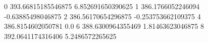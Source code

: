 0 393.66815185546875 6.852691650390625
1 386.1766052246094 -0.63885498046875
2 386.56170654296875 -0.253753662109375
4 386.8154602050781 0.0
6 388.6300964355469 1.81463623046875
8 392.0641174316406 5.2486572265625
